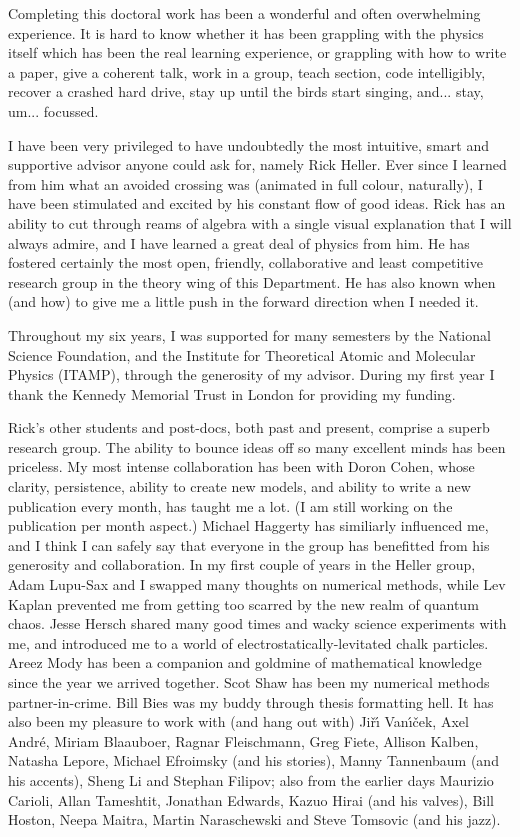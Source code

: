 \begin{acknowledgments}

Completing this doctoral work
has been a wonderful and often overwhelming experience.
It is hard to know whether it has been grappling with the physics
itself which has been the real learning experience, or grappling with
how to write a paper, give a coherent talk, work in a group, teach section, code
intelligibly, recover a crashed hard drive,
stay up until the birds start singing,
and... stay, um... focussed.

I have been very privileged to have undoubtedly the most intuitive,
smart and supportive advisor anyone could ask for, namely Rick Heller.
Ever since I learned from him what an avoided crossing was
(animated in full colour, naturally), I have been stimulated and excited
by his constant flow of good ideas.
Rick has an ability to cut through reams of algebra with a single visual
explanation that I will always admire, and I have learned a great deal
of physics from him.
He has fostered certainly the most open, friendly,
collaborative and least competitive
research group in the theory wing of this Department.
He has also known when (and how)
to give me a little push in the forward direction when I needed it.

Throughout my six years, I was supported for many semesters
by the National Science Foundation, and the Institute for Theoretical
Atomic and Molecular Physics (ITAMP), through the generosity of my advisor.
During my first year I thank the Kennedy Memorial Trust in London for
providing my funding.

Rick's other students and post-docs, both past and present, comprise a
superb research group.
The ability to bounce ideas off so many excellent minds has been priceless.
My most intense collaboration has been with Doron Cohen,
whose clarity, persistence, ability to create new models, and
ability to write a new publication every month,
has taught me a lot.
(I am still working on the publication per month aspect.)
Michael Haggerty has similiarly influenced me, and I
think I can safely say that everyone in the group has benefitted from
his generosity and collaboration.
In my first couple of years in the Heller group, Adam Lupu-Sax and I
swapped many thoughts on numerical methods, while Lev Kaplan prevented me
from getting too scarred by the new realm of quantum chaos.
Jesse Hersch shared many good times and wacky science experiments
with me, and introduced me to a world of
electrostatically-levitated chalk particles.
Areez Mody has been a companion and goldmine of mathematical knowledge
since the year we arrived together.
Scot Shaw has been my numerical methods partner-in-crime.
Bill Bies was my buddy through thesis formatting hell.
It has also been my pleasure to work with (and hang out with)
Ji\v{r}\'{\i} Van\'{\i}\v{c}ek,  Axel Andr\'{e},
Miriam Blaauboer,
Ragnar Fleischmann,  Greg Fiete,  Allison Kalben, Natasha Lepore,
Michael Efroimsky (and his stories),
Manny Tannenbaum (and his accents), Sheng Li and Stephan Filipov;
also from the earlier days
Maurizio Carioli, Allan Tameshtit,
Jonathan Edwards, Kazuo Hirai (and his valves),
Bill Hoston,  Neepa Maitra,  Martin Naraschewski
and Steve Tomsovic (and his jazz).


\end{acknowledgments}
